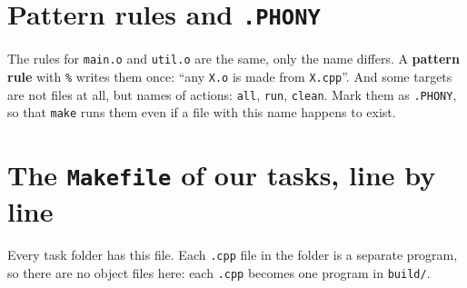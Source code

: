 \documentclass[a4paper,11pt]{article}
\begin{document}
\section{Pattern rules and \texttt{.PHONY}}

The rules for \texttt{main.o} and \texttt{util.o} are the same, only the name differs. A \textbf{pattern rule} with
\texttt{\%} writes them once: ``any \texttt{X.o} is made from \texttt{X.cpp}''. And some targets are not files at all,
but names of actions: \texttt{all}, \texttt{run}, \texttt{clean}. Mark them as \texttt{.PHONY}, so that \texttt{make}
runs them even if a file with this name happens to exist.



\section{The \texttt{Makefile} of our tasks, line by line}

Every task folder has this file. Each \texttt{.cpp} file in the folder is a separate program, so there are no
object files here: each \texttt{.cpp} becomes one program in \texttt{build/}.

\end{document}
